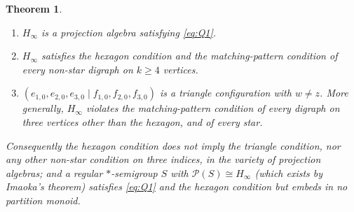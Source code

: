 \documentclass[11pt]{amsart}
\newtheorem{theorem}{Theorem}[section]
\theoremstyle{definition}
\renewcommand{\P}{\mathcal{P}}
\begin{document}
\begin{theorem}\label{thm:hinf}
\begin{enumerate}[label=\textup{(\alph*)}]
\item $H_\infty$ is a projection algebra satisfying \eqref{eq:Q1}.
\item $H_\infty$ satisfies the hexagon condition and the matching-pattern condition of every non-star digraph on $k\ge4$ vertices.
\item $(e_{1,0},e_{2,0},e_{3,0}\mid f_{1,0},f_{2,0},f_{3,0})$ is a triangle configuration with $w\ne z$. More generally, $H_\infty$ violates the matching-pattern condition of every digraph on three vertices other than the hexagon, and of every star.
\end{enumerate}
Consequently the hexagon condition does not imply the triangle condition, nor any other non-star condition on three indices, in the variety of projection algebras; and a regular $*$-semigroup $S$ with $\P(S)\cong H_\infty$ (which exists by Imaoka's theorem) satisfies \eqref{eq:Q1} and the hexagon condition but embeds in no partition monoid.
\end{theorem}
\end{document}

